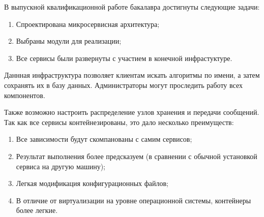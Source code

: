 \Conclusion %

В выпускной квалификационной работе бакалавра достигнуты следующие задачи:
\begin{enumerate}[label=\arabic*.]
    \item Спроектирована микросервисная архитектура;
    \item Выбраны модули для реализации;
    \item Все сервисы были развернуты с участием в конечной инфрастуктуре.
\end{enumerate}

Даннная инфраструктура позволяет клиентам искать алгоритмы по имени, а затем
сохранять их в базу данных. Администраторы могут проследить работу всех
компонентов.

Также возможно настроить распределение узлов хранения и передачи сообщений. Так
как все сервисы контейнезированы, это дало несколько преимуществ:
\begin{enumerate}[label=\arabic*.]
    \item Все зависимости будут скомпанованы с самим сервисов;
    \item Результат выполнения более предсказуем (в сравнении с обычной
        установкой сервиса на другую машину);
    \item Легкая модификация конфигурационных файлов;
    \item В отличие от виртуализации на уровне операционной системы,
        контейнеры более легкие.
\end{enumerate}


